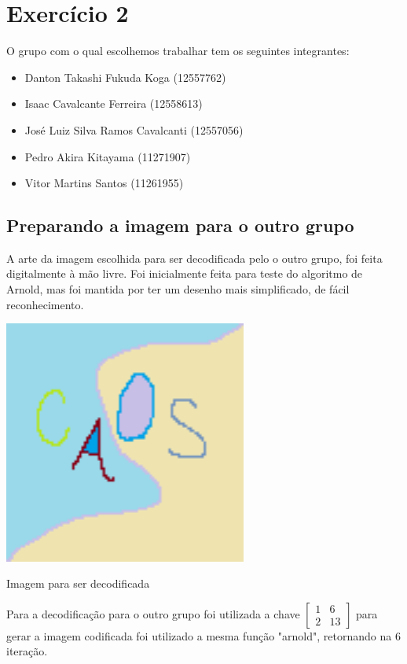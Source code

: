 \documentclass[a4paper, 12pt]{article}
\begin{document}
\section{Exercício 2}
O grupo com o qual escolhemos trabalhar tem os seguintes integrantes:

\begin{itemize}
    \item Danton Takashi Fukuda Koga (12557762)
    \item Isaac Cavalcante Ferreira (12558613)
    \item José Luiz Silva Ramos Cavalcanti (12557056)
    \item Pedro Akira Kitayama (11271907)
    \item Vitor Martins Santos (11261955)
\end{itemize}

\subsection{Preparando a imagem para o outro grupo}

A arte da imagem escolhida para ser decodificada pelo o outro grupo, foi feita digitalmente à mão livre. Foi inicialmente feita para teste do algoritmo de Arnold, mas foi mantida por ter um desenho mais simplificado, de fácil reconhecimento. 

\begin{center}

\includegraphics[width=8cm]{Caos.png}

Imagem para ser decodificada

\end{center}

Para a decodificação para o outro grupo foi utilizada a chave $\begin{bmatrix} 1 & 6 \\ 2 & 13\end{bmatrix}$ para gerar a imagem codificada foi utilizado a mesma função "arnold", retornando na 6 iteração.
\end{document}
